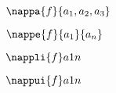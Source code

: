\documentclass[minimal]{omdoc}
\begin{document}
$\nappa{f}{a_1,a_2,a_3}$

$\nappe{f}{a_1}{a_n}$

$\nappli{f}a1n$

$\nappui{f}a1n$
\end{document}
